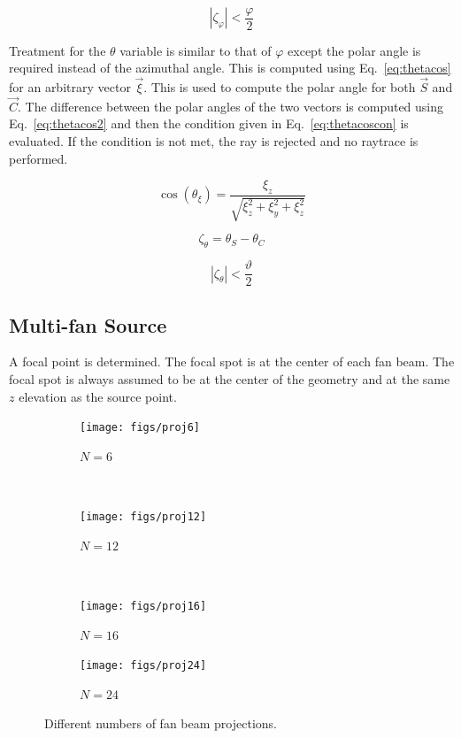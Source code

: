 \begin{equation}\label{eq:phicoscon}
|\zeta_\varphi| < \frac{\varphi}{2}
\end{equation}

Treatment for the $\theta$ variable is similar to that of $\varphi$ except the polar angle is required instead of the azimuthal angle. This is computed using Eq.~\ref{eq:thetacos} for an arbitrary vector $\vec{\xi}$. This is used to compute the polar angle for both $\vec{S}$ and $\vec{C}$. The difference between the polar angles of the two vectors is computed using Eq.~\ref{eq:thetacos2} and then the condition given in Eq.~\ref{eq:thetacoscon} is evaluated. If the condition is not met, the ray is rejected and no raytrace is performed.

\begin{equation}\label{eq:thetacos}
\cos(\theta_\xi) = \frac{\xi_z}{\sqrt{\xi_z^2 + \xi_y^2 + \xi_z^2}}
\end{equation}

\begin{equation}\label{eq:thetacos2}
\zeta_\theta = \theta_S - \theta_C
\end{equation}

\begin{equation}\label{eq:thetacoscon}
|\zeta_\theta| < \frac{\vartheta}{2}
\end{equation}


\subsection{Multi-fan Source}
A focal point is determined. The focal spot is at the center of each fan beam. The focal spot is always assumed to be at the center of the geometry and at the same $z$ elevation as the source point.

\begin{figure}
    \centering
    \begin{subfigure}[b]{0.2\textwidth}
        \texttt{[image: figs/proj6]}
        \caption{$N=6$}
        \label{fig:proj6}
    \end{subfigure}
    ~ %
    \begin{subfigure}[b]{0.2\textwidth}
        \texttt{[image: figs/proj12]}
        \caption{$N=12$}
        \label{fig:proj12}
    \end{subfigure}
    ~ %
    \begin{subfigure}[b]{0.2\textwidth}
        \texttt{[image: figs/proj16]}
        \caption{$N=16$}
        \label{fig:proj16}
    \end{subfigure}
    \begin{subfigure}[b]{0.2\textwidth}
        \texttt{[image: figs/proj24]}
        \caption{$N=24$}
        \label{fig:proj24}
    \end{subfigure}
    \caption{Different numbers of fan beam projections.}\label{fig:fanproj}
\end{figure}

